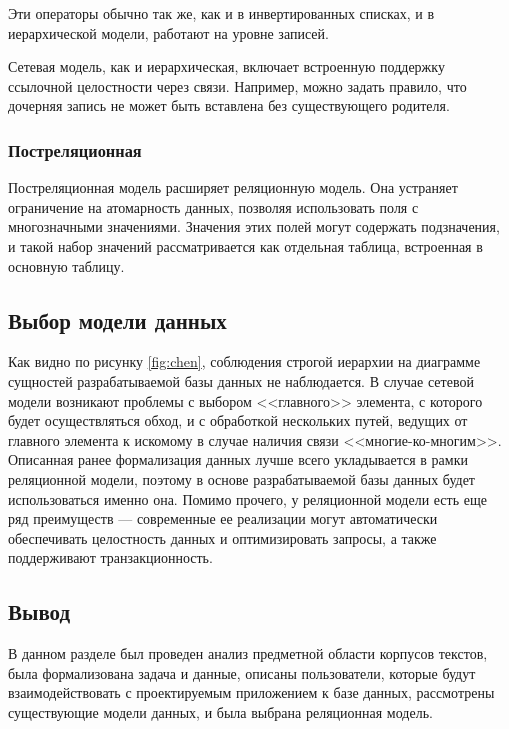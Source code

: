Эти операторы обычно так же, как и в инвертированных списках, и в иерархической модели, работают на уровне записей.

Сетевая модель, как и иерархическая, включает встроенную поддержку ссылочной целостности через связи.
Например, можно задать правило, что дочерняя запись не может быть вставлена без существующего родителя.~\cite{date-wr}

\subsubsection{Постреляционная}

Постреляционная модель расширяет реляционную модель.
Она устраняет ограничение на атомарность данных, позволяя использовать поля с многозначными значениями.
Значения этих полей могут содержать подзначения, и такой набор значений рассматривается как отдельная таблица, встроенная в основную таблицу.~\cite{lecnotes} %

\subsection{Выбор модели данных}

Как видно по рисунку \ref{fig:chen}, соблюдения строгой иерархии на диаграмме сущностей разрабатываемой базы данных не наблюдается.
В случае сетевой модели возникают проблемы с выбором <<главного>> элемента, с которого будет осуществляться обход, и с обработкой нескольких путей, ведущих от главного элемента к искомому в случае наличия связи <<многие-ко-многим>>.
Описанная ранее формализация данных лучше всего укладывается в рамки реляционной модели, поэтому в основе разрабатываемой базы данных будет использоваться именно она.
Помимо прочего, у реляционной модели есть еще ряд преимуществ --- современные ее реализации могут автоматически обеспечивать целостность данных и оптимизировать запросы, а также поддерживают транзакционность.

\subsection*{Вывод}

В данном разделе был проведен анализ предметной области корпусов текстов, была формализована задача и данные, описаны пользователи, которые будут взаимодействовать с проектируемым приложением к базе данных, рассмотрены существующие модели данных, и была выбрана реляционная модель.
